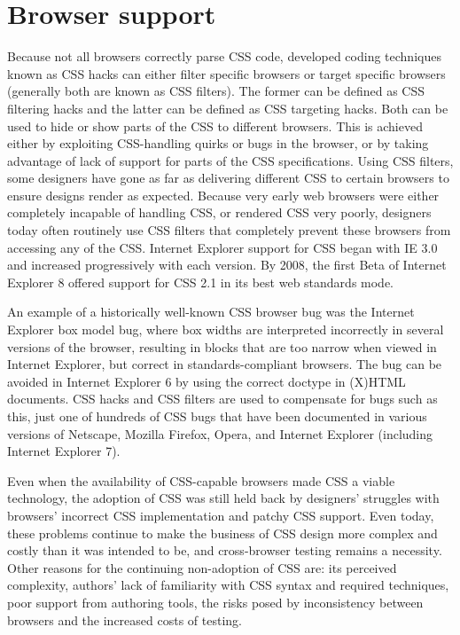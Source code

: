 \section{Browser support}

Because not all browsers correctly parse CSS code, developed coding techniques known as CSS hacks can either filter specific browsers or target specific browsers (generally both are known as CSS filters). The former can be defined as CSS filtering hacks and the latter can be defined as CSS targeting hacks. Both can be used to hide or show parts of the CSS to different browsers. This is achieved either by exploiting CSS-handling quirks or bugs in the browser, or by taking advantage of lack of support for parts of the CSS specifications. Using CSS filters, some designers have gone as far as delivering different CSS to certain browsers to ensure designs render as expected. Because very early web browsers were either completely incapable of handling CSS, or rendered CSS very poorly, designers today often routinely use CSS filters that completely prevent these browsers from accessing any of the CSS. Internet Explorer support for CSS began with IE 3.0 and increased progressively with each version. By 2008, the first Beta of Internet Explorer 8 offered support for CSS 2.1 in its best web standards mode.

An example of a historically well-known CSS browser bug was the Internet Explorer box model bug, where box widths are interpreted incorrectly in several versions of the browser, resulting in blocks that are too narrow when viewed in Internet Explorer, but correct in standards-compliant browsers. The bug can be avoided in Internet Explorer 6 by using the correct doctype in (X)HTML documents. CSS hacks and CSS filters are used to compensate for bugs such as this, just one of hundreds of CSS bugs that have been documented in various versions of Netscape, Mozilla Firefox, Opera, and Internet Explorer (including Internet Explorer 7).


Even when the availability of CSS-capable browsers made CSS a viable technology, the adoption of CSS was still held back by designers' struggles with browsers' incorrect CSS implementation and patchy CSS support. Even today, these problems continue to make the business of CSS design more complex and costly than it was intended to be, and cross-browser testing remains a necessity. Other reasons for the continuing non-adoption of CSS are: its perceived complexity, authors' lack of familiarity with CSS syntax and required techniques, poor support from authoring tools, the risks posed by inconsistency between browsers and the increased costs of testing.

